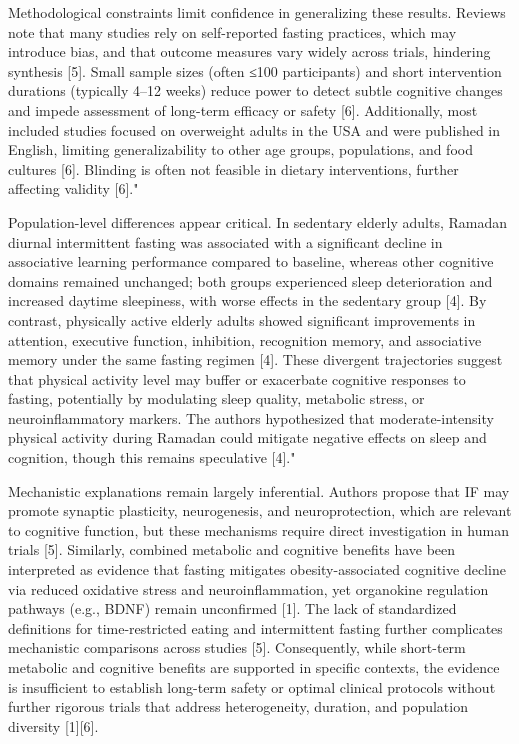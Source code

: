 \documentclass[conference]{IEEEtran}
\begin{document}
Methodological constraints limit confidence in generalizing these results. Reviews note that many studies rely on self-reported fasting practices, which may introduce bias, and that outcome measures vary widely across trials, hindering synthesis [5]. Small sample sizes (often ≤100 participants) and short intervention durations (typically 4–12 weeks) reduce power to detect subtle cognitive changes and impede assessment of long-term efficacy or safety [6]. Additionally, most included studies focused on overweight adults in the USA and were published in English, limiting generalizability to other age groups, populations, and food cultures [6]. Blinding is often not feasible in dietary interventions, further affecting validity [6]."

Population-level differences appear critical. In sedentary elderly adults, Ramadan diurnal intermittent fasting was associated with a significant decline in associative learning performance compared to baseline, whereas other cognitive domains remained unchanged; both groups experienced sleep deterioration and increased daytime sleepiness, with worse effects in the sedentary group [4]. By contrast, physically active elderly adults showed significant improvements in attention, executive function, inhibition, recognition memory, and associative memory under the same fasting regimen [4]. These divergent trajectories suggest that physical activity level may buffer or exacerbate cognitive responses to fasting, potentially by modulating sleep quality, metabolic stress, or neuroinflammatory markers. The authors hypothesized that moderate-intensity physical activity during Ramadan could mitigate negative effects on sleep and cognition, though this remains speculative [4]."

Mechanistic explanations remain largely inferential. Authors propose that IF may promote synaptic plasticity, neurogenesis, and neuroprotection, which are relevant to cognitive function, but these mechanisms require direct investigation in human trials [5]. Similarly, combined metabolic and cognitive benefits have been interpreted as evidence that fasting mitigates obesity-associated cognitive decline via reduced oxidative stress and neuroinflammation, yet organokine regulation pathways (e.g., BDNF) remain unconfirmed [1]. The lack of standardized definitions for time-restricted eating and intermittent fasting further complicates mechanistic comparisons across studies [5]. Consequently, while short-term metabolic and cognitive benefits are supported in specific contexts, the evidence is insufficient to establish long-term safety or optimal clinical protocols without further rigorous trials that address heterogeneity, duration, and population diversity [1][6].
\end{document}
